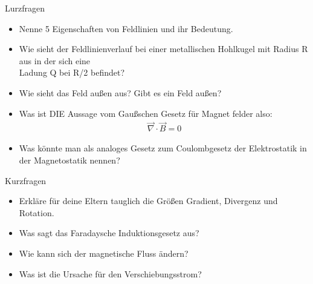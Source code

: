 \begin{frame}{Lurzfragen}
    \begin{itemize}
        \item Nenne 5 Eigenschaften von Feldlinien und ihr Bedeutung.
        \item <2-> Wie sieht der Feldlinienverlauf bei einer metallischen Hohlkugel mit Radius R aus in der sich eine\\
        Ladung Q bei R/2 befindet? 
        \item Wie sieht das Feld außen aus? Gibt es ein Feld außen?
        \item <3-> Was ist DIE Aussage vom Gaußschen Gesetz für Magnet felder also:
        \begin{align*}
            \vec{\nabla} \cdot \vec{B} = 0
        \end{align*}
        \item <4-> Was könnte man als analoges Gesetz zum Coulombgesetz der Elektrostatik in der Magnetostatik nennen?
    \end{itemize}
    
\end{frame}\begin{frame}{Kurzfragen}
    \begin{itemize}
        \item Erkläre für deine Eltern tauglich die Größen Gradient, Divergenz und Rotation. 
        \item <2-> Was sagt das Faradaysche Induktionsgesetz aus?
        \item <3-> Wie kann sich der magnetische Fluss ändern?
        \item <4-> Was ist die Ursache für den Verschiebungsstrom?       
    \end{itemize}    
\end{frame}

